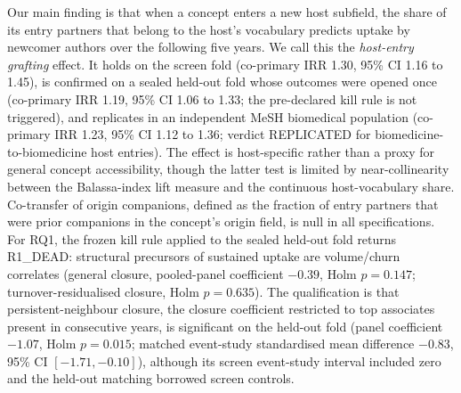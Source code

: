 \documentclass[11pt,letterpaper]{article}
\begin{document}
Our main finding is that when a concept enters a new host subfield, the share of its entry partners that belong
to the host's vocabulary predicts uptake by newcomer authors over the following five years. We call this the
\emph{host-entry grafting} effect. It holds on the screen fold (co-primary IRR 1.30, 95\% CI 1.16 to 1.45), is confirmed on a sealed held-out
fold whose outcomes were opened once (co-primary IRR 1.19, 95\% CI 1.06 to 1.33; the pre-declared kill rule is
not triggered), and replicates in an independent MeSH biomedical population (co-primary IRR 1.23, 95\% CI 1.12
to 1.36; verdict REPLICATED for biomedicine-to-biomedicine host entries). The effect is host-specific rather than a
proxy for general concept accessibility, though the latter test is limited by near-collinearity between the
Balassa-index lift measure and the continuous host-vocabulary share. Co-transfer of origin companions, defined
as the fraction of entry partners that were prior companions in the concept's origin field, is null in all
specifications. For RQ1, the frozen kill rule applied to the sealed held-out fold returns R1\_DEAD: structural precursors
of sustained uptake are volume/churn correlates (general closure, pooled-panel coefficient $-0.39$,
Holm $p = 0.147$; turnover-residualised closure, Holm $p = 0.635$). The qualification is that persistent-neighbour
closure, the closure coefficient restricted to top associates present in consecutive years, is significant on
the held-out fold (panel coefficient $-1.07$, Holm $p = 0.015$; matched event-study standardised mean difference
$-0.83$, 95\% CI $[-1.71, -0.10]$), although its screen event-study interval included zero and the held-out
matching borrowed screen controls.
\end{document}
